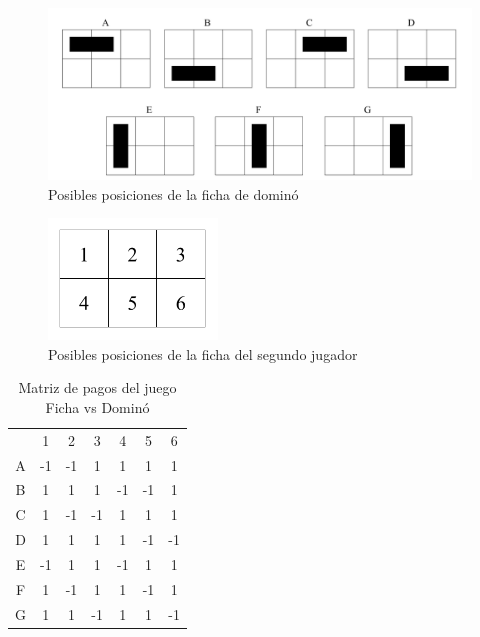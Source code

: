 \begin{figure}
\caption{Posibles posiciones de la ficha de dominó}
\label{fig:posiciones-domino}
\centering
\includegraphics[width=1\textwidth]{figuras/posiciones-domino.png}
\end{figure}

\begin{figure}
\caption{Posibles posiciones de la ficha del segundo jugador}
\label{fig:posiciones}
\centering
\includegraphics[width=0.4\textwidth]{figuras/posiciones.png}
\end{figure}

\begin{table}
\begin{center}
\caption{Matriz de pagos del juego Ficha vs Dominó}
\label{table:pagos-domino}
\begin{tabular}{ c | c | c | c | c | c | c |}
\multicolumn{1}{c}{}  &  \multicolumn{1}{c}{1} &  \multicolumn{1}{c}{2} & \multicolumn{1}{c}{3} & \multicolumn{1}{c}{4} & \multicolumn{1}{c}{5} & \multicolumn{1}{c}{6} \\ \cline{2-7}
A & -1 & -1 &  1 &  1 &  1 &  1 \\ \cline{2-7}
B &  1 &  1 &  1 & -1 & -1 &  1 \\ \cline{2-7}
C &  1 & -1 & -1 &  1 &  1 &  1 \\ \cline{2-7}
D &  1 &  1 &  1 &  1 & -1 & -1 \\ \cline{2-7}
E & -1 &  1 &  1 & -1 &  1 &  1 \\ \cline{2-7}
F &  1 & -1 &  1 &  1 & -1 &  1 \\ \cline{2-7}
G &  1 &  1 & -1 &  1 &  1 & -1 \\ \cline{2-7}
\end{tabular}
\end{center}
\end{table}

